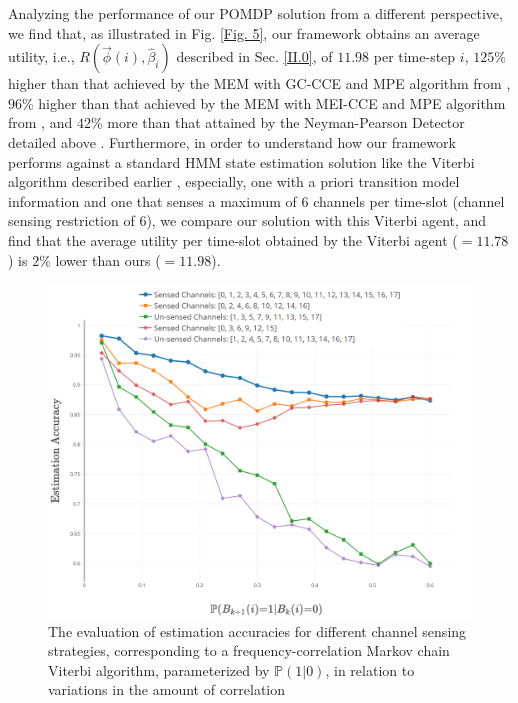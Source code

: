 \documentclass[12pt, draftcls, onecolumn]{IEEEtran}
\begin{document}
Analyzing the performance of our POMDP solution from a different perspective, we find that, as illustrated in Fig. \ref{Fig. 5}, our framework obtains an average utility, i.e., $R(\vec{\phi}(i),\hat{\beta}_{i})$ described in Sec. \ref{II.0}, of $11.98$ per time-step $i$, $125$\% higher than that achieved by the MEM with GC-CCE and MPE algorithm from \cite{WCL:7}, $96$\% higher than that achieved by the MEM with MEI-CCE and MPE algorithm from \cite{WCL:7}, and $42$\% more than that attained by the Neyman-Pearson Detector detailed above \cite{WCL:11}. Furthermore, in order to understand how our framework performs against a standard HMM state estimation solution like the Viterbi algorithm described earlier \cite{WCL:6}, especially, one with a priori transition model information and one that senses a maximum of $6$ channels per time-slot (channel sensing restriction of $6$), we compare our solution with this Viterbi agent, and find that the average utility per time-slot obtained by the Viterbi agent (${=}11.78$) is $2$\% lower than ours (${=}11.98$).
\begin{figure} [htb]
    \centerline{
    \includegraphics[width = 0.8\linewidth]{figures/Modified_Viterbi_Accuracies_Plot_Single_Chain.png}}
    \caption{The evaluation of estimation accuracies for different channel sensing strategies, corresponding to a frequency-correlation Markov chain Viterbi algorithm, parameterized by $\mathbb{P}(1|0)$, in relation to variations in the amount of correlation}
    \label{Fig. 6}
\end{figure}
\end{document}
